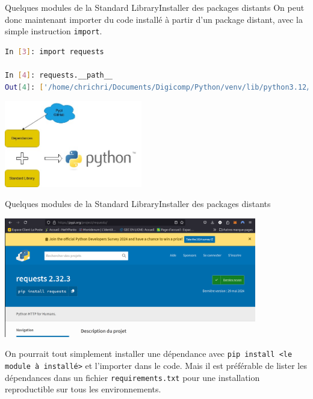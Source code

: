 \documentclass{beamer}
\begin{document}
    \begin{frame}[fragile]{Quelques modules de la Standard Library}{Installer des packages distants}
        On peut donc maintenant importer du code installé à partir d'un package distant, avec la simple instruction \lstinline{import}.
        \begin{lstlisting}[language=Bash]
In [3]: import requests

In [4]: requests.__path__
Out[4]: ['/home/chrichri/Documents/Digicomp/Python/venv/lib/python3.12/site-packages/requests']
        \end{lstlisting}
        \bigbreak
        \begin{center}
            \includegraphics[width=6cm]{image/std-plus-dependencies}
        \end{center}
    \end{frame}

    \begin{frame}{Quelques modules de la Standard Library}{Installer des packages distants}
        \begin{center}
            \includegraphics[width=11cm]{image/pypi-requests-page}
        \end{center}
        \begin{dangercolorbox}
            On pourrait tout simplement installer une dépendance avec \lstinline{pip install <le module à installé>} et l'importer dans le code.
            Mais il est préférable de lister les dépendances dans un fichier \lstinline{requirements.txt} pour une installation reproductible sur tous les environnements.
        \end{dangercolorbox}
    \end{frame}
\end{document}
